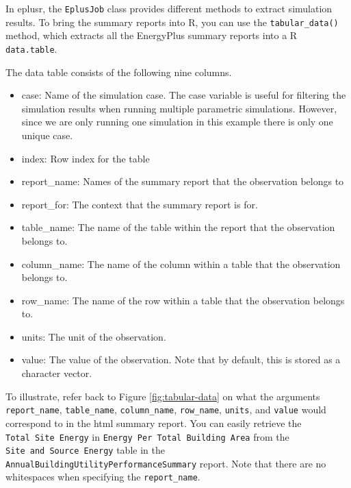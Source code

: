 \documentclass[
]{book}
\newenvironment{Shaded}{\begin{snugshade}}{\end{snugshade}}
\newcommand{\DocumentationTok}[1]{\textcolor[rgb]{0.56,0.35,0.01}{\textbf{\textit{#1}}}}
\newcommand{\FunctionTok}[1]{\textcolor[rgb]{0.00,0.00,0.00}{#1}}
\newcommand{\NormalTok}[1]{#1}
\newcommand{\OtherTok}[1]{\textcolor[rgb]{0.56,0.35,0.01}{#1}}
\newcommand{\SpecialCharTok}[1]{\textcolor[rgb]{0.00,0.00,0.00}{#1}}
\providecommand{\tightlist}{%
  \setlength{\itemsep}{0pt}\setlength{\parskip}{0pt}}
\begin{document}
In eplusr, the \texttt{EplusJob} class provides different methods to extract simulation results. To bring the summary reports into R, you can use the \texttt{tabular\_data()} method, which extracts all the EnergyPlus summary reports into a R \texttt{data.table}.

The data table consists of the following nine columns.

\begin{itemize}
\tightlist
\item
  case: Name of the simulation case. The case variable is useful for filtering the simulation results when running multiple parametric simulations. However, since we are only running one simulation in this example there is only one unique case.
\item
  index: Row index for the table
\item
  report\_name: Names of the summary report that the observation belongs to
\item
  report\_for: The context that the summary report is for.
\item
  table\_name: The name of the table within the report that the observation belongs to.
\item
  column\_name: The name of the column within a table that the observation belongs to.
\item
  row\_name: The name of the row within a table that the observation belongs to.
\item
  units: The unit of the observation.
\item
  value: The value of the observation. Note that by default, this is stored as a character vector.
\end{itemize}

\begin{Shaded}
\end{Shaded}

To illustrate, refer back to Figure \ref{fig:tabular-data} on what the arguments \texttt{report\_name}, \texttt{table\_name}, \texttt{column\_name}, \texttt{row\_name}, \texttt{units}, and \texttt{value} would correspond to in the html summary report. You can easily retrieve the \texttt{Total\ Site\ Energy} in \texttt{Energy\ Per\ Total\ Building\ Area} from the \texttt{Site\ and\ Source\ Energy} table in the \texttt{AnnualBuildingUtilityPerformanceSummary} report. Note that there are no whitespaces when specifying the \texttt{report\_name}.
\end{document}
